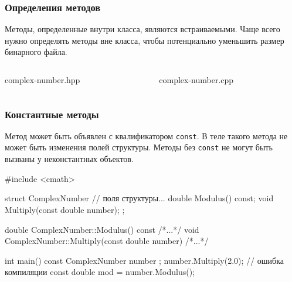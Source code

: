 \documentclass[compress, 8pt]{beamer}
\begin{document}
\begin{frame}[fragile]

    \frametitle{Определения методов}

    Методы, определенные внутри класса, являются встраиваемыми.
    Чаще всего нужно определять методы вне класса, чтобы потенциально
    уменьшить размер бинарного файла.

    \begin{columns}[T]

        \begin{column}{0.4\textwidth}

                {complex-number.hpp}

        \end{column}

        \begin{column}{0.6\textwidth}

                {complex-number.cpp}

        \end{column}

    \end{columns}

\end{frame}

\begin{frame}[fragile]

    \frametitle{Константные методы}

    \hfill\break
    Метод может быть объявлен с квалификатором \verb|const|.
    В теле такого метода не может быть изменения полей структуры.
    Методы без \verb|const| не могут быть вызваны у неконстантных объектов.

    \begin{myinplacelisting}[minted language=cpp]
#include <cmath>

struct ComplexNumber {
    // поля структуры...
    double Modulus() const;
    void Multiply(const double number);
};

double ComplexNumber::Modulus() const {/*...*/}
void ComplexNumber::Multiply(const double number)
{/*...*/}

int main() {
    const ComplexNumber number {};
    number.Multiply(2.0); // ошибка компиляции
    const double mod = number.Modulus();
}
    \end{myinplacelisting}

\end{frame}
\end{document}
